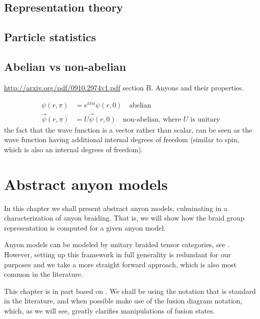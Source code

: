 \documentclass[a4paper,10pt,oneside]{book}
\theoremstyle{plain}
\theoremstyle{definition}
\theoremstyle{remark}
\begin{document}
{\section{Representation theory}

\section{Particle statistics}


\section{Abelian vs non-abelian}

\url{http://arxiv.org/pdf/0910.2974v1.pdf} section B. Anyons and their properties.

\begin{align*}
  \psi(r,\pi) &= e^{i\pi\alpha} \psi(r, 0) \quad\text{abelian} \\
  \vec{\psi}(r,\pi) &= U \vec{\psi}(r, 0) \quad\text{non-abelian, where $U$ is unitary}
\end{align*}
the fact that the wave function is a vector rather than scalar, can be seen as the wave function having additional internal degrees of freedom (similar to spin, which is also an internal degrees of freedom).



\chapter{Abstract anyon models}\label{anyon models}



In this chapter we shall present abstract anyon models, culminating in a characterization of anyon braiding. That is, we will show how the braid group representation is computed for a given anyon model.

Anyon models can be modeled by unitary braided tensor categories, see \cite{kitaev}. However, setting up this framework in full generality is redundant for our purposes and we take a more straight forward approach, which is also most common in the literature.

This chapter is in part based on \cite{preskill,kitaev,bonderson}. We shall be using the notation that is standard in the literature, and when possible make use of the fusion diagram notation, which, as we will see, greatly clarifies manipulations of fusion states.


}
\end{document}
